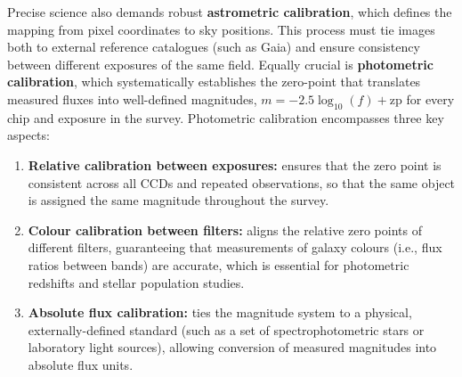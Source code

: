 Precise science also demands robust \textbf{astrometric calibration}, which defines the mapping from pixel coordinates to sky positions. This process must tie images both to external reference catalogues (such as Gaia) and ensure consistency between different exposures of the same field. Equally crucial is \textbf{photometric calibration}, which systematically establishes the zero-point that translates measured fluxes into well-defined magnitudes, $ m = -2.5\log_{10}(f) + \text{zp} $ for every chip and exposure in the survey. Photometric calibration encompasses three key aspects:
\begin{enumerate}
    \item \textbf{Relative calibration between exposures:} ensures that the zero point is consistent across all CCDs and repeated observations, so that the same object is assigned the same magnitude throughout the survey.
    \item \textbf{Colour calibration between filters:} aligns the relative zero points of different filters, guaranteeing that measurements of galaxy colours (i.e., flux ratios between bands) are accurate, which is essential for photometric redshifts and stellar population studies.
    \item \textbf{Absolute flux calibration:} ties the magnitude system to a physical, externally-defined standard (such as a set of spectrophotometric stars or laboratory light sources), allowing conversion of measured magnitudes into absolute flux units.
\end{enumerate}

\smallskip

